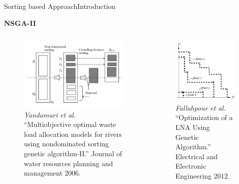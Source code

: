 \begin{frame}{Sorting based Approach}{Introduction}

{\bf NSGA-II}

\begin{columns}
\begin{figure}
	\centering
	\includegraphics[width=\linewidth]{figure/NSGA_II}
	\caption{\tiny {\it Yandamuri et al.} ``Multiobjective optimal waste load allocation models for rivers using nondominated sorting genetic algorithm-II.'' Journal of water resources planning and management 2006.}
\end{figure}

\begin{figure}
	\centering
	\includegraphics[width=.7\linewidth]{figure/NSGA_II_front}
	\caption{\tiny {\it Fallahpour et al.} ``Optimization of a LNA Using Genetic Algorithm.'' Electrical and Electronic Engineering 2012.}
\end{figure}
\end{columns}

\end{frame}

